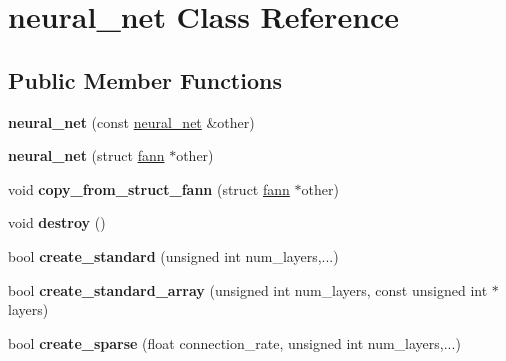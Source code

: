 \hypertarget{class_f_a_n_n_1_1neural__net}{\section{neural\-\_\-net Class Reference}
\label{class_f_a_n_n_1_1neural__net}
}
\subsection*{Public Member Functions}
\begin{DoxyCompactItemize}
\item 
\hypertarget{class_f_a_n_n_1_1neural__net_a3bd042682d99150e5f88ad0102982d48}{{\bfseries neural\-\_\-net} (const \hyperlink{class_f_a_n_n_1_1neural__net}{neural\-\_\-net} \&other)}\label{class_f_a_n_n_1_1neural__net_a3bd042682d99150e5f88ad0102982d48}

\item 
\hypertarget{class_f_a_n_n_1_1neural__net_ac1df4a9456c5658ea3fcedeca05042e8}{{\bfseries neural\-\_\-net} (struct \hyperlink{structfann}{fann} $\ast$other)}\label{class_f_a_n_n_1_1neural__net_ac1df4a9456c5658ea3fcedeca05042e8}

\item 
\hypertarget{class_f_a_n_n_1_1neural__net_aed7a1273df3d52e006286aa3e593e610}{void {\bfseries copy\-\_\-from\-\_\-struct\-\_\-fann} (struct \hyperlink{structfann}{fann} $\ast$other)}\label{class_f_a_n_n_1_1neural__net_aed7a1273df3d52e006286aa3e593e610}

\item 
\hypertarget{class_f_a_n_n_1_1neural__net_a3a80b6032f86a56bec74609034b3246f}{void {\bfseries destroy} ()}\label{class_f_a_n_n_1_1neural__net_a3a80b6032f86a56bec74609034b3246f}

\item 
\hypertarget{class_f_a_n_n_1_1neural__net_a76fd95298b82456a9724ad792b120743}{bool {\bfseries create\-\_\-standard} (unsigned int num\-\_\-layers,...)}\label{class_f_a_n_n_1_1neural__net_a76fd95298b82456a9724ad792b120743}

\item 
\hypertarget{class_f_a_n_n_1_1neural__net_ad19f82c373464c91e6c95ab18ac20542}{bool {\bfseries create\-\_\-standard\-\_\-array} (unsigned int num\-\_\-layers, const unsigned int $\ast$layers)}\label{class_f_a_n_n_1_1neural__net_ad19f82c373464c91e6c95ab18ac20542}

\item 
\hypertarget{class_f_a_n_n_1_1neural__net_abdc8dc779c17c2736f89ae5cc7c6e20a}{bool {\bfseries create\-\_\-sparse} (float connection\-\_\-rate, unsigned int num\-\_\-layers,...)}\label{class_f_a_n_n_1_1neural__net_abdc8dc779c17c2736f89ae5cc7c6e20a}


\end{DoxyCompactItemize}

